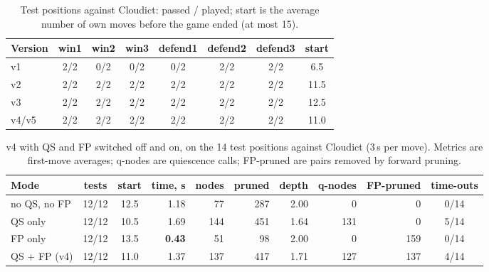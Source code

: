 \documentclass[a4paper,10pt,twocolumn]{article}
\begin{document}
\begin{table}[t]
\centering
\caption{Test positions against Cloudict: passed / played; start is the average number of own moves before the game ended (at most 15).}
\label{tab:battery}
\begin{tabular}{@{}lcccccc|c@{}}
\toprule
Version & win1 & win2 & win3 & defend1 & defend2 & defend3 & start \\
\midrule
v1 & 2/2 & \cellcolor{red!12}0/2 & \cellcolor{red!12}0/2 & \cellcolor{red!12}0/2 & 2/2 & 2/2 & 6.5 \\
v2 & 2/2 & 2/2 & 2/2 & 2/2 & 2/2 & 2/2 & 11.5 \\
v3 & 2/2 & 2/2 & 2/2 & 2/2 & 2/2 & 2/2 & 12.5 \\
v4/v5 & 2/2 & 2/2 & 2/2 & 2/2 & 2/2 & 2/2 & 11.0 \\
\bottomrule
\end{tabular}
\end{table}

\begin{table}[t]
\centering
\caption{v4 with QS and FP switched off and on, on the 14 test positions against Cloudict (3\,s per move). Metrics are first-move averages; q-nodes are quiescence calls; FP-pruned are pairs removed by forward pruning.}
\label{tab:ablation}
\begin{tabular}{@{}lccrrrrrrc@{}}
\toprule
Mode & tests & start & time, s & nodes & pruned & depth & q-nodes & FP-pruned & time-outs \\
\midrule
no QS, no FP & 12/12 & 12.5 & 1.18 & 77 & 287 & 2.00 & 0 & 0 & 0/14 \\
QS only & 12/12 & 10.5 & 1.69 & 144 & 451 & 1.64 & 131 & 0 & 5/14 \\
FP only & 12/12 & 13.5 & \textbf{0.43} & 51 & 98 & 2.00 & 0 & 159 & 0/14 \\
QS + FP (v4) & 12/12 & 11.0 & 1.37 & 137 & 417 & 1.71 & 127 & 137 & 4/14 \\
\bottomrule
\end{tabular}
\end{table}
\end{document}
